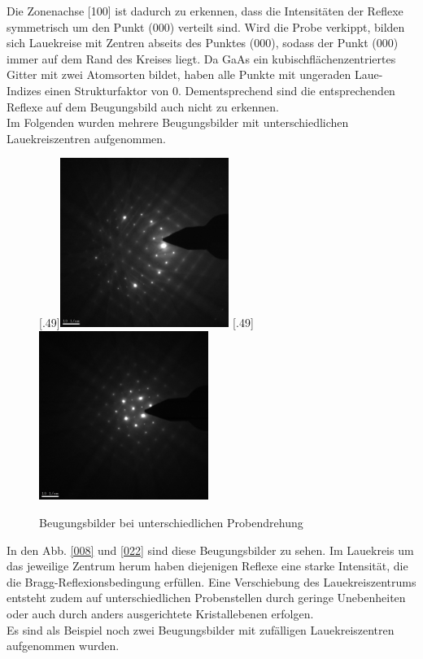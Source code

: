 \documentclass[a4paper,11pt,DIV=11]{scrartcl}
\begin{document}
Die Zonenachse [100] ist dadurch zu erkennen, dass die Intensitäten der Reflexe symmetrisch um den Punkt (000) verteilt sind. Wird die Probe verkippt, bilden sich Lauekreise mit Zentren abseits des Punktes (000), sodass der Punkt (000) immer auf dem Rand des Kreises liegt. Da GaAs ein kubischflächenzentriertes Gitter mit zwei Atomsorten bildet, haben alle Punkte mit ungeraden Laue-Indizes einen Strukturfaktor von 0. Dementsprechend sind die entsprechenden Reflexe auf dem Beugungsbild auch nicht zu erkennen. \\
Im Folgenden wurden mehrere Beugungsbilder mit unterschiedlichen Lauekreiszentren aufgenommen.

\begin{figure}[htb]\centering
	[.49\linewidth]{\includegraphics[width=0.49\textwidth]{Versuchsdaten/9/008.jpg}}
	[.49\linewidth]{\includegraphics[width=0.49\textwidth]{Versuchsdaten/9/022.jpg}}\\
	\caption{Beugungsbilder bei unterschiedlichen Probendrehung} \label{laue1}
\end{figure}

In den Abb. \ref{008} und \ref{022} sind diese Beugungsbilder zu sehen. Im Lauekreis um das jeweilige Zentrum herum haben diejenigen Reflexe eine starke Intensität, die die Bragg-Reflexionsbedingung erfüllen. Eine Verschiebung des Lauekreiszentrums entsteht zudem auf unterschiedlichen Probenstellen durch geringe Unebenheiten oder auch durch anders ausgerichtete Kristallebenen erfolgen. \\
Es sind als Beispiel noch zwei Beugungsbilder mit zufälligen Lauekreiszentren aufgenommen wurden.
\end{document}
